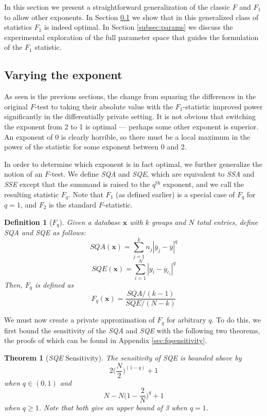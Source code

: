 \documentclass[USenglish,oneside]{article}
\newcounter{ab}
\newcounter{ar}
\newcounter{igh}
\newcounter{ms}
\newtheorem{theorem}{Theorem}
\newtheorem{definition}{Definition}
\newcommand{\dbsize}{\ensuremath{N}\xspace}
\renewcommand{\k}{\ensuremath{k}\xspace}
\newcommand{\sse}{\textit{SSE}\xspace}
\newcommand{\ssa}{\textit{SSA}\xspace}
\newcommand{\sqa}{\textit{SQA}\xspace}
\newcommand{\sqe}{\textit{SQE}\xspace}
\newcommand{\x}{\ensuremath{\mathbf{x}}\xspace}
\begin{document}
In this section we present a straightforward generalization of the classic $F$ and $F_1$ to allow other exponents. In Section \ref{subsec:fq} we show that in this generalized class of statistics $F_1$ is indeed optimal. In Section \ref{subsec:params} we discuss the experimental exploration of the full parameter space that guides the formulation of the $F_1$ statistic.

\subsection{Varying the exponent}\label{subsec:fq}
As seen is the previous sections, the change from squaring the differences in the original $F$-test to taking their absolute value with the $F_1$-statistic improved power significantly in the differentially private setting. It is not obvious that switching the exponent from 2 to 1 is optimal --- perhaps some other exponent is superior. An exponent of 0 is clearly horrible, so there must be a local maximum in the power of the statistic for some exponent between 0 and 2.

In order to determine which exponent is in fact optimal, we further generalize the notion of an $F$-test.  We define \sqa and \sqe, which are equivalent to \ssa and \sse except that the summand is raised to the $q^{\text{th}}$ exponent, and we call the resulting statistic $F_q$.  Note that $F_1$ (as defined earlier) is a special case of $F_q$ for $q=1$, and $F_2$ is the standard $F$-statistic.

\begin{definition}[$F_q$] \label{def:Fq} 
Given a database \x with \k groups and \dbsize total entries, define \sqa and \sqe as follows:
%
\begin{equation*}
\sqa(\x) = \sum_{j=1}^k n_j \left\vert \overline{y}_j - \overline{y} \right\vert^q
\end{equation*}
%
\begin{equation*}
\sqe(\x) = \sum_{i=1}^N \left\vert y_i - \overline{y}_{c_i} \right\vert^q
\end{equation*}
%
Then, $F_q$ is defined as
%
\begin{equation*}
F_q(\x) = \frac{\sqa/(\k-1)}{\sqe/(\dbsize-\k)}
\end{equation*}
%
\end{definition}
We must now create a private approximation of $F_q$ for arbitrary $q$.  To do this, we first bound the sensitivity of the \sqa and \sqe with the following two theorems, the proofs of which can be found in Appendix \ref{sec:fqsensitivity}.
\begin{theorem}[\sqe Sensitivity] \label{thm:SQEsens} 
The sensitivity of \sqe is bounded above by
\begin{equation*}
2\bigg(\frac{\dbsize}{2}\bigg)^{(1-q)} + 1
\end{equation*}
when $q \in (0,1)$ and
\begin{equation*}
\dbsize - \dbsize\bigg(1-\frac{2}{\dbsize}\bigg)^q +1 
\end{equation*}
when $q\geq 1$. Note that both give an upper bound of 3 when $q=1$.
\end{theorem}
\end{document}
